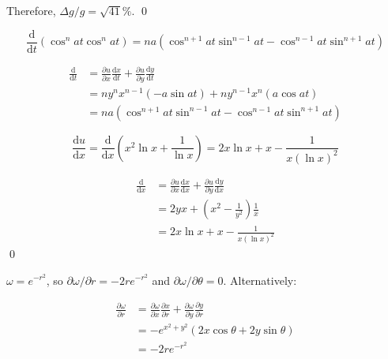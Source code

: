 \documentclass[12pt]{article}
\begin{document}
Therefore, $\Delta g/g = \sqrt{41}\%$.
\qed




\begin{equation}
    \frac{\mathrm{d}}{\mathrm{d}t} \left( \cos^{n}{at} \cos^{n}{at} \right) = na \left( \cos^{n + 1}{at} \sin^{n - 1}{at} - \cos^{n - 1}{at} \sin^{n + 1}{at}\right)
\end{equation}

\begin{equation}
    \begin{split}
        \frac{\mathrm{d}}{\mathrm{d}t} &= \frac{\partial u}{\partial x} \frac{\mathrm{d}x}{\mathrm{d}t} + \frac{\partial u}{\partial y} \frac{\mathrm{d}y}{\mathrm{d}t} \\
        &= n y^{n} x^{n - 1} (-a\sin{at}) + n y^{n - 1} x^{n} (a\cos{at}) \\
        &= na \left( \cos^{n + 1}{at} \sin^{n - 1}{at} - \cos^{n - 1}{at} \sin^{n + 1}{at}\right)
    \end{split}
\end{equation}


\begin{equation}
    \frac{\mathrm{d}u}{\mathrm{d}x} = \frac{\mathrm{d}}{\mathrm{d}x} \left( x^{2} \ln{x} + \frac{1}{\ln{x}} \right) = 2x \ln{x} + x - \frac{1}{x (\ln{x})^{2}}
\end{equation}

\begin{equation}
    \begin{split}
        \frac{\mathrm{d}}{\mathrm{d}x} &= \frac{\partial u}{\partial x} \frac{\mathrm{d}x}{\mathrm{d}x} + \frac{\partial u}{\partial y} \frac{\mathrm{d}y}{\mathrm{d}x} \\
        &= 2yx + (x^{2} - \frac{1}{y^{2}}) \frac{1}{x} \\
        &= 2x \ln{x} + x - \frac{1}{x (\ln{x})^{2}}
    \end{split}
\end{equation}
\qed


$\omega = e^{-r^{2}}$, so $\partial \omega/\partial r = -2r e^{-r^{2}}$ and $\partial \omega/\partial \theta = 0$. Alternatively:

\begin{equation}
    \begin{split}
        \frac{\partial \omega}{\partial r} &= \frac{\partial \omega}{\partial x} \frac{\partial x}{\partial r} + \frac{\partial \omega}{\partial y} \frac{\partial y}{\partial r} \\
        &= -e^{x^{2} + y^{2}} (2x \cos{\theta} + 2y \sin{\theta}) \\
        &= -2r e^{-r^{2}}
    \end{split}
\end{equation}
\end{document}
